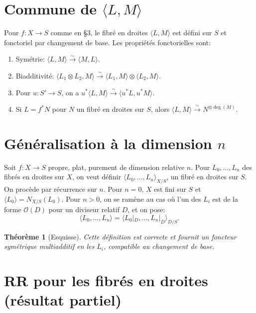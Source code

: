 \documentclass[11pt,a4paper]{article}
\theoremstyle{plain}
\newtheorem{theorem}{Th\'eor\`eme}[section]
\theoremstyle{definition}
\newcommand{\cO}{\mathcal{O}}
\begin{document}
\section{Commune de $\langle L, M \rangle$}

Pour $f: X \to S$ comme en \S3, le fibr\'e en droites $\langle L, M \rangle$ est d\'efini sur $S$ et fonctoriel par changement de base. Les propri\'et\'es fonctorielles sont:
\begin{enumerate}
\item[(i)] Sym\'etrie: $\langle L, M \rangle \xrightarrow{\sim} \langle M, L \rangle$.
\item[(ii)] Biadditivit\'e: $\langle L_1 \otimes L_2, M \rangle \xrightarrow{\sim} \langle L_1, M \rangle \otimes \langle L_2, M \rangle$.
\item[(iii)] Pour $u: S' \to S$, on a $u^* \langle L, M \rangle \xrightarrow{\sim} \langle u^* L, u^* M \rangle$.
\item[(iv)] Si $L = f^* N$ pour $N$ un fibr\'e en droites sur $S$, alors $\langle L, M \rangle \xrightarrow{\sim} N^{\otimes \deg(M)}$.
\end{enumerate}

\section{G\'en\'eralisation \`a la dimension $n$}

Soit $f: X \to S$ propre, plat, purement de dimension relative $n$. Pour $L_0, \ldots, L_n$ des fibr\'es en droites sur $X$, on veut d\'efinir $\langle L_0, \ldots, L_n \rangle_{X/S}$, un fibr\'e en droites sur $S$. On proc\`ede par r\'ecurrence sur $n$. Pour $n = 0$, $X$ est fini sur $S$ et $\langle L_0 \rangle = N_{X/S}(L_0)$. Pour $n > 0$, on se ram\`ene au cas o\`u l'un des $L_i$ est de la forme $\cO(D)$ pour un diviseur relatif $D$, et on pose:
\begin{equation}
\langle L_0, \ldots, L_n \rangle = \langle L_0|_D, \ldots, L_n|_D \rangle_{D/S}.
\end{equation}

\begin{theorem}[Esquisse]
Cette d\'efinition est correcte et fournit un foncteur sym\'etrique multiadditif en les $L_i$, compatible au changement de base.
\end{theorem}

\section{RR pour les fibr\'es en droites (r\'esultat partiel)}
\end{document}
